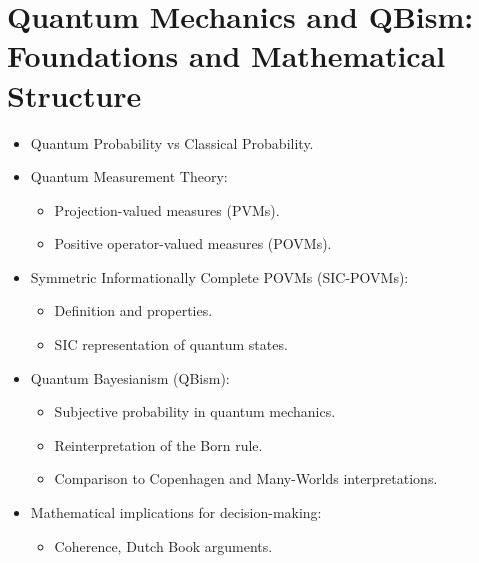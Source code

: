 \documentclass[12pt]{article}
\begin{document}
\section{Quantum Mechanics and QBism: Foundations and Mathematical Structure}
\begin{itemize}
    \item Quantum Probability vs Classical Probability.
    \item Quantum Measurement Theory:
    \begin{itemize}
        \item Projection-valued measures (PVMs).
        \item Positive operator-valued measures (POVMs).
    \end{itemize}
    \item Symmetric Informationally Complete POVMs (SIC-POVMs):
    \begin{itemize}
        \item Definition and properties.
        \item SIC representation of quantum states.
    \end{itemize}
    \item Quantum Bayesianism (QBism):
    \begin{itemize}
        \item Subjective probability in quantum mechanics.
        \item Reinterpretation of the Born rule.
        \item Comparison to Copenhagen and Many-Worlds interpretations.
    \end{itemize}
    \item Mathematical implications for decision-making:
    \begin{itemize}
        \item Coherence, Dutch Book arguments.
    \end{itemize}
\end{itemize}
\end{document}
